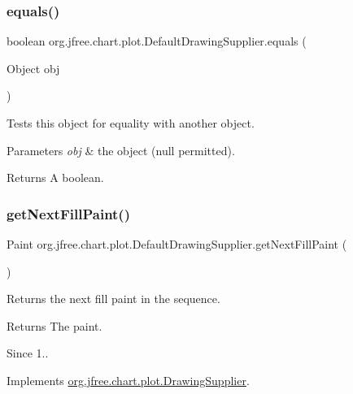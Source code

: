 \subsubsection{\texorpdfstring{equals()}{equals()}}
{\footnotesize\ttfamily boolean org.\+jfree.\+chart.\+plot.\+Default\+Drawing\+Supplier.\+equals (\begin{DoxyParamCaption}\item[{Object}]{obj }\end{DoxyParamCaption})}

Tests this object for equality with another object.


\begin{DoxyParams}{Parameters}
{\em obj} & the object ({\ttfamily null} permitted).\\
\hline
\end{DoxyParams}
\begin{DoxyReturn}{Returns}
A boolean. 
\end{DoxyReturn}
\mbox{\label{classorg_1_1jfree_1_1chart_1_1plot_1_1_default_drawing_supplier_a25a4db4213706fe8b54a0490aa14e727}} 
\subsubsection{\texorpdfstring{get\+Next\+Fill\+Paint()}{getNextFillPaint()}}
{\footnotesize\ttfamily Paint org.\+jfree.\+chart.\+plot.\+Default\+Drawing\+Supplier.\+get\+Next\+Fill\+Paint (\begin{DoxyParamCaption}{ }\end{DoxyParamCaption})}

Returns the next fill paint in the sequence.

\begin{DoxyReturn}{Returns}
The paint.
\end{DoxyReturn}
\begin{DoxySince}{Since}
1.. 
\end{DoxySince}


Implements \mbox{\hyperlink{interfaceorg_1_1jfree_1_1chart_1_1plot_1_1_drawing_supplier_ad9386ba5a8bd895ba5b4850618324366}{org.\+jfree.\+chart.\+plot.\+Drawing\+Supplier}}.

